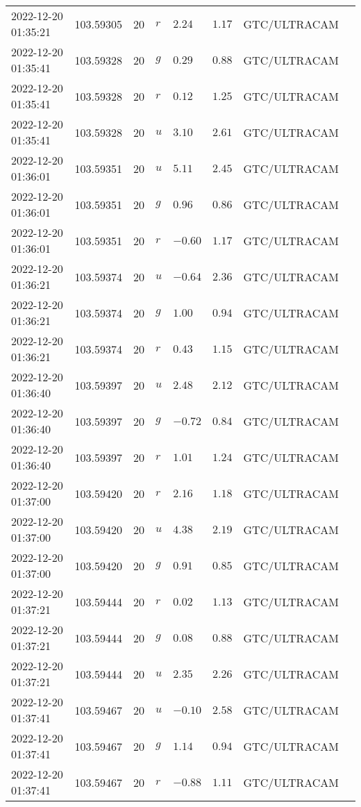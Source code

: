 \documentclass{nature_plusfigure}
\begin{document}
\begin{supplement}
\begin{center}
\begin{longtable}{llllllll}
2022-12-20 01:35:21 & 103.59305 & 20 & $r$ & $2.24$ & $1.17$ & GTC/ULTRACAM &  \\ 
2022-12-20 01:35:41 & 103.59328 & 20 & $g$ & $0.29$ & $0.88$ & GTC/ULTRACAM &  \\ 
2022-12-20 01:35:41 & 103.59328 & 20 & $r$ & $0.12$ & $1.25$ & GTC/ULTRACAM &  \\ 
2022-12-20 01:35:41 & 103.59328 & 20 & $u$ & $3.10$ & $2.61$ & GTC/ULTRACAM &  \\ 
2022-12-20 01:36:01 & 103.59351 & 20 & $u$ & $5.11$ & $2.45$ & GTC/ULTRACAM &  \\ 
2022-12-20 01:36:01 & 103.59351 & 20 & $g$ & $0.96$ & $0.86$ & GTC/ULTRACAM &  \\ 
2022-12-20 01:36:01 & 103.59351 & 20 & $r$ & $-0.60$ & $1.17$ & GTC/ULTRACAM &  \\ 
2022-12-20 01:36:21 & 103.59374 & 20 & $u$ & $-0.64$ & $2.36$ & GTC/ULTRACAM &  \\ 
2022-12-20 01:36:21 & 103.59374 & 20 & $g$ & $1.00$ & $0.94$ & GTC/ULTRACAM &  \\ 
2022-12-20 01:36:21 & 103.59374 & 20 & $r$ & $0.43$ & $1.15$ & GTC/ULTRACAM &  \\ 
2022-12-20 01:36:40 & 103.59397 & 20 & $u$ & $2.48$ & $2.12$ & GTC/ULTRACAM &  \\ 
2022-12-20 01:36:40 & 103.59397 & 20 & $g$ & $-0.72$ & $0.84$ & GTC/ULTRACAM &  \\ 
2022-12-20 01:36:40 & 103.59397 & 20 & $r$ & $1.01$ & $1.24$ & GTC/ULTRACAM &  \\ 
2022-12-20 01:37:00 & 103.59420 & 20 & $r$ & $2.16$ & $1.18$ & GTC/ULTRACAM &  \\ 
2022-12-20 01:37:00 & 103.59420 & 20 & $u$ & $4.38$ & $2.19$ & GTC/ULTRACAM &  \\ 
2022-12-20 01:37:00 & 103.59420 & 20 & $g$ & $0.91$ & $0.85$ & GTC/ULTRACAM &  \\ 
2022-12-20 01:37:21 & 103.59444 & 20 & $r$ & $0.02$ & $1.13$ & GTC/ULTRACAM &  \\ 
2022-12-20 01:37:21 & 103.59444 & 20 & $g$ & $0.08$ & $0.88$ & GTC/ULTRACAM &  \\ 
2022-12-20 01:37:21 & 103.59444 & 20 & $u$ & $2.35$ & $2.26$ & GTC/ULTRACAM &  \\ 
2022-12-20 01:37:41 & 103.59467 & 20 & $u$ & $-0.10$ & $2.58$ & GTC/ULTRACAM &  \\ 
2022-12-20 01:37:41 & 103.59467 & 20 & $g$ & $1.14$ & $0.94$ & GTC/ULTRACAM &  \\ 
2022-12-20 01:37:41 & 103.59467 & 20 & $r$ & $-0.88$ & $1.11$ & GTC/ULTRACAM &  \\ 

\end{longtable}
\end{center}
\end{supplement}
\end{document}
